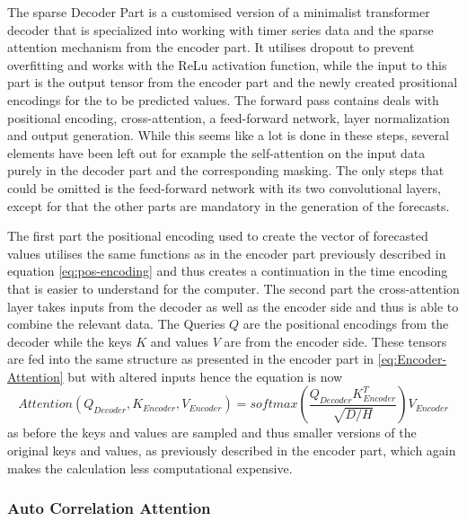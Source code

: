 \documentclass{article}
\begin{document}
The sparse Decoder Part is a customised version of a minimalist transformer decoder that is specialized into working with timer series data and the sparse attention mechanism from the encoder part. It utilises dropout to prevent overfitting and works with the ReLu activation function, while the input to this part is the output tensor from the encoder part and the newly created prositional encodings for the to be predicted values. The forward pass contains deals with positional encoding, cross-attention, a feed-forward network, layer normalization and output generation. While this seems like a lot is done in these steps, several elements have been left out for example the self-attention on the input data purely in the decoder part and the corresponding masking. The only steps that could be omitted is the feed-forward network with its two convolutional layers, except for that the other parts are mandatory in the generation of the forecasts.\par 
The first part the positional encoding used to create the vector of forecasted values utilises the same functions as in the encoder part previously described in equation \ref{eq:pos-encoding} and thus creates a continuation in the time encoding that is easier to understand for the computer. The second part the cross-attention layer takes inputs from the decoder as well as the encoder side and thus is able to combine the relevant data. The Queries $Q$ are the positional encodings from the decoder while the keys $K$ and values $V$ are from the encoder side. These tensors are fed into the same structure as presented in the encoder part in \ref{eq:Encoder-Attention} but with altered inputs hence the equation is now
\begin{equation}\label{eq:Decoder-CrossAttention}
    Attention(Q_{Decoder}, K_{Encoder}, V_{Encoder}) = softmax \left( \frac{Q_{Decoder} K_{Encoder}^T}{\sqrt{D / H}} \right) V_{Encoder}
\end{equation}
as before the keys and values are sampled and thus smaller versions of the original keys and values, as previously described in the encoder part, which again makes the calculation less computational expensive. 


\subsubsection{Auto Correlation Attention}

\newpage

\printbibliography
\end{document}
